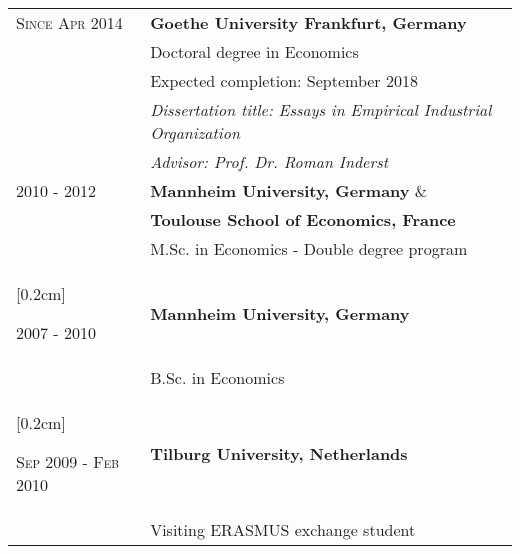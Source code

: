 \documentclass[a4paper,10pt]{article} %
\begin{document}
\begin{tabular}{P{4.5cm} P{11cm}}
\textsc{Since  Apr 2014}  & \textbf{Goethe University Frankfurt, Germany} \\
	&Doctoral degree in Economics  \\
	&Expected completion: September 2018 \\
	&\small \emph{Dissertation title: Essays in Empirical Industrial Organization} \\
	&\small \emph{Advisor: Prof. Dr. Roman Inderst} \\[0.2cm] 


 \textsc{2010 - 2012} & \textbf{Mannheim University, Germany} \&  \\
 & \textbf{Toulouse School of Economics, France} \\ 
									&	 M.Sc. in Economics - Double degree program    \\
									[0.2cm] 


 \textsc{2007 - 2010} &  \textbf{Mannheim University, Germany}  \\
										 & B.Sc. in Economics  \\
									[0.2cm] 

	\textsc{Sep 2009 - Feb 2010} & \textbf{Tilburg University, Netherlands}   \\
										  & Visiting ERASMUS exchange student  \\[0.2cm] 



\end{tabular}


\end{document}
